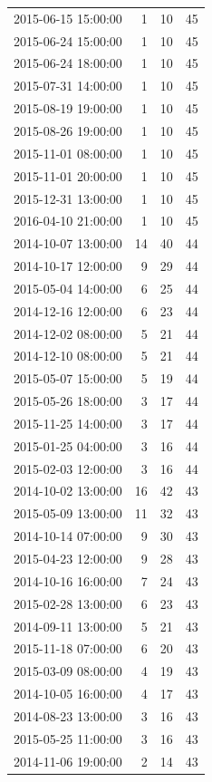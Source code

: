 \begin{tabular}{lrrr}
2015-06-15 15:00:00 & 1 & 10 & 45 \\
2015-06-24 15:00:00 & 1 & 10 & 45 \\
2015-06-24 18:00:00 & 1 & 10 & 45 \\
2015-07-31 14:00:00 & 1 & 10 & 45 \\
2015-08-19 19:00:00 & 1 & 10 & 45 \\
2015-08-26 19:00:00 & 1 & 10 & 45 \\
2015-11-01 08:00:00 & 1 & 10 & 45 \\
2015-11-01 20:00:00 & 1 & 10 & 45 \\
2015-12-31 13:00:00 & 1 & 10 & 45 \\
2016-04-10 21:00:00 & 1 & 10 & 45 \\
2014-10-07 13:00:00 & 14 & 40 & 44 \\
2014-10-17 12:00:00 & 9 & 29 & 44 \\
2015-05-04 14:00:00 & 6 & 25 & 44 \\
2014-12-16 12:00:00 & 6 & 23 & 44 \\
2014-12-02 08:00:00 & 5 & 21 & 44 \\
2014-12-10 08:00:00 & 5 & 21 & 44 \\
2015-05-07 15:00:00 & 5 & 19 & 44 \\
2015-05-26 18:00:00 & 3 & 17 & 44 \\
2015-11-25 14:00:00 & 3 & 17 & 44 \\
2015-01-25 04:00:00 & 3 & 16 & 44 \\
2015-02-03 12:00:00 & 3 & 16 & 44 \\
2014-10-02 13:00:00 & 16 & 42 & 43 \\
2015-05-09 13:00:00 & 11 & 32 & 43 \\
2014-10-14 07:00:00 & 9 & 30 & 43 \\
2015-04-23 12:00:00 & 9 & 28 & 43 \\
2014-10-16 16:00:00 & 7 & 24 & 43 \\
2015-02-28 13:00:00 & 6 & 23 & 43 \\
2014-09-11 13:00:00 & 5 & 21 & 43 \\
2015-11-18 07:00:00 & 6 & 20 & 43 \\
2015-03-09 08:00:00 & 4 & 19 & 43 \\
2014-10-05 16:00:00 & 4 & 17 & 43 \\
2014-08-23 13:00:00 & 3 & 16 & 43 \\
2015-05-25 11:00:00 & 3 & 16 & 43 \\
2014-11-06 19:00:00 & 2 & 14 & 43 \\

\end{tabular}
